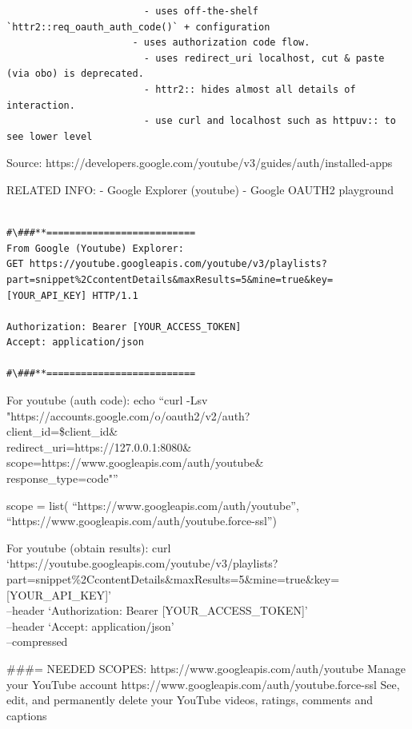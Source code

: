 \documentclass[
]{report}
\begin{document}
\begin{verbatim}
                        - uses off-the-shelf `httr2::req_oauth_auth_code()` + configuration
                      - uses authorization code flow.
                        - uses redirect_uri localhost, cut & paste (via obo) is deprecated.
                        - httr2:: hides almost all details of interaction.
                        - use curl and localhost such as httpuv:: to see lower level
\end{verbatim}

Source:
https://developers.google.com/youtube/v3/guides/auth/installed-apps

RELATED INFO: - Google Explorer (youtube) - Google OAUTH2 playground

\begin{verbatim}

#\###**==========================
From Google (Youtube) Explorer:
GET https://youtube.googleapis.com/youtube/v3/playlists?part=snippet%2CcontentDetails&maxResults=5&mine=true&key=[YOUR_API_KEY] HTTP/1.1

Authorization: Bearer [YOUR_ACCESS_TOKEN]
Accept: application/json

#\###**==========================
\end{verbatim}

For youtube (auth code): echo ``curl -Lsv
"https://accounts.google.com/o/oauth2/v2/auth?\\
client\_id=\$client\_id\&\\
redirect\_uri=https://127.0.0.1:8080\&\\
scope=https://www.googleapis.com/auth/youtube\&\\
response\_type=code"''

scope = list( ``https://www.googleapis.com/auth/youtube'',
``https://www.googleapis.com/auth/youtube.force-ssl'')

For youtube (obtain results): curl\\
`https://youtube.googleapis.com/youtube/v3/playlists?part=snippet\%2CcontentDetails\&maxResults=5\&mine=true\&key={[}YOUR\_API\_KEY{]}'\\
--header `Authorization: Bearer {[}YOUR\_ACCESS\_TOKEN{]}'\\
--header `Accept: application/json'\\
--compressed

\#\#\#= NEEDED SCOPES: https://www.googleapis.com/auth/youtube Manage
your YouTube account https://www.googleapis.com/auth/youtube.force-ssl
See, edit, and permanently delete your YouTube videos, ratings, comments
and captions
\end{document}
